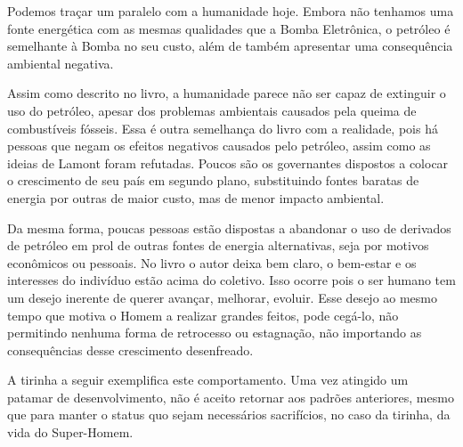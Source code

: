 \documentclass[14pt,portuguese]{extreport}
\begin{document}
      Podemos traçar um paralelo com a humanidade hoje. 
      Embora não tenhamos uma fonte energética com as mesmas qualidades que a Bomba Eletrônica, o petróleo é semelhante à Bomba no seu custo, 
      além de também apresentar uma consequência ambiental negativa.

      Assim como descrito no livro, a humanidade parece não ser capaz de extinguir o uso do petróleo, 
      apesar dos problemas ambientais causados pela queima de combustíveis fósseis. 
      Essa é outra semelhança do livro com a realidade, pois há pessoas que negam os efeitos negativos causados pelo petróleo, 
      assim como as ideias de Lamont foram refutadas. Poucos são os governantes dispostos a colocar o crescimento de seu país 
      em segundo plano, substituindo fontes baratas de energia por outras de maior custo, mas de menor impacto ambiental.

      Da mesma forma, poucas pessoas estão dispostas a abandonar o uso de derivados de petróleo em prol de outras fontes de 
      energia alternativas, seja por motivos econômicos ou pessoais. No livro o autor deixa bem claro, o bem-estar e os interesses 
      do indivíduo estão acima do coletivo. Isso ocorre pois o ser humano tem um desejo inerente de querer avançar, melhorar, evoluir. 
      Esse desejo ao mesmo tempo que motiva o Homem a realizar grandes feitos, pode cegá-lo, não permitindo nenhuma forma de retrocesso 
      ou estagnação, não importando as consequências desse crescimento desenfreado.

      A tirinha a seguir exemplifica este comportamento. Uma vez atingido um patamar de desenvolvimento, não é aceito retornar aos padrões anteriores, 
      mesmo que para manter o status quo sejam necessários sacrifícios, no caso da tirinha, da vida do Super-Homem.
      
\end{document}
